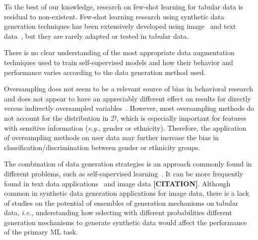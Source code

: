 \documentclass[parskip=full]{scrartcl}
\begin{document}

To the best of our knowledge, research on few-shot learning for tabular data
is residual to non-existent. Few-shot learning research using synthetic data
generation techniques has been extensively developed using
image~\cite{cubuk2019autoaugment, zhao2019data} and text
data~\cite{zhou2021flipda}, but they are rarely adapted or tested in tabular
data.


There is no clear understanding of the most appropriate data augmentation
techniques used to train self-supervised models and how their behavior and
performance varies according to the data generation method used.


Oversampling does not seem to be a relevant source of bias in behavioral
research and does not appear to have an appreciably different effect on
results for directly versus indirectly oversampled
variables~\cite{hauner2014latent}. However, most oversampling methods do not
account for the distribution in $\mathcal{D}$, which is especially important
for features with sensitive information (\textit{e.g.}, gender or ethnicity).
Therefore, the application of oversampling methods on user data may further
increase the bias in classification/discrimination between gender or ethnicity
groups.


The combination of data generation strategies is an approach commonly found in
different problems, such as self-supervised
learning~\cite{grill2020bootstrap}. It can be more frequently found in text
data applications~\cite{bayer2021survey} and image data \textbf{[CITATION]}.
Although common in synthetic data generation applications for image data,
there is a lack of studies on the potential of ensembles of generation
mechanisms on tabular data, \textit{i.e.}, understanding how selecting with
different probabilities different generation mechanisms to generate synthetic
data would affect the performance of the primary ML task.



% 
\end{document}
